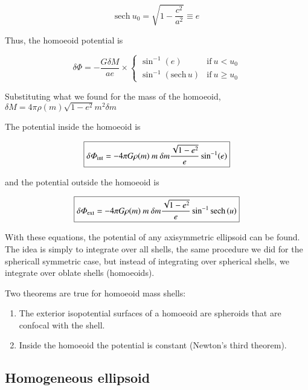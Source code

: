 \begin{equation}
 \mathrm{sech} \ u_0 = \sqrt{1-\frac{c^2}{a^2}}  \equiv e 
\end{equation}


Thus, the homoeoid potential is 

\begin{equation}
\boxed{
\delta\varPhi = -\frac{G\delta M}{ae} \times \left\{ \begin{array}{ll} 
\sin^{-1}(e) & \mathrm{if} \ u < u_0 \\
\sin^{-1}(\mathrm{sech}\,u) & \mathrm{if} \ u \geq u_0
\end{array} \right.}
\end{equation}


Substituting what we found for the mass of the homoeoid, $\delta M = 4\pi \rho(m) \sqrt{1-e^2} m^2 \delta m$

The potential inside the homoeoid is  


\begin{equation}
\boxed{
\delta \varPhi_{\rm int} = -4\pi G \rho(m) \ m \ \delta m \frac{\sqrt{1-e^2}}{e}\sin^{-1}(e)
}
\end{equation}

and the potential outside the homoeoid is 


\begin{equation}
\boxed{
\delta \varPhi_{\rm ext} = -4\pi G \rho(m) \ m \ \delta m \frac{\sqrt{1-e^2}}{e}\sin^{-1} \mathrm{sech}\left(u\right)
}
\end{equation}


With these equations, the potential of any axisymmetric ellipsoid can be found. The idea is simply to integrate over all shells, the same procedure we did for the sphericall symmetric case, but instead of integrating over spherical shells, we integrate over oblate shells (homoeoids). 

Two theorems are true for homoeoid mass shells: 
\begin{enumerate}
\item The exterior isopotential surfaces of a homoeoid are spheroids that are confocal with the shell. 
\item Inside the homoeoid the potential is constant (Newton's third theorem).
\end{enumerate}

\subsection{Homogeneous ellipsoid}


